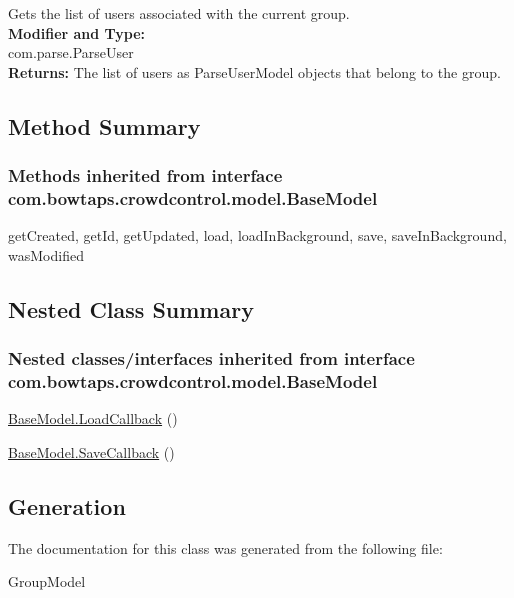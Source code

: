 Gets the list of users associated with the current group.\\

\textbf{Modifier and Type:}\\
\tab com.parse.ParseUser\\

\textbf{Returns:}
\tab     The list of users as ParseUserModel objects that belong to the group.\\


\subsection{Method Summary}

\subsubsection{Methods inherited from interface com.bowtaps.crowdcontrol.model.BaseModel}

getCreated, getId, getUpdated, load, loadInBackground, save, saveInBackground, wasModified\\


\subsection{Nested Class Summary}

\subsubsection{Nested classes/interfaces inherited from interface com.bowtaps.crowdcontrol.model.BaseModel}
\begin{DoxyCompactItemize}
\item 
\hyperlink{class_BaseModel.Android.LoadCallback}{BaseModel.LoadCallback} ()
\item 
\hyperlink{class_BaseModel.Android.SaveCallback}{BaseModel.SaveCallback} ()
\end{DoxyCompactItemize} 





\subsection{Generation}
The documentation for this class was generated from the following file\-:
\begin{DoxyCompactItemize}
\item GroupModel
\end{DoxyCompactItemize} 









